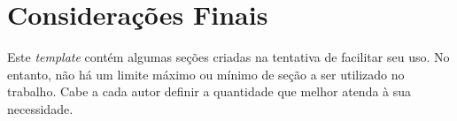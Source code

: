 \chapter{Considerações Finais}\label{sec:consideracoesfinais}

Este \textit{template} contém algumas seções criadas na tentativa de facilitar seu uso. No entanto, não há um limite máximo ou mínimo de seção a ser utilizado no trabalho. Cabe a cada autor definir a quantidade que melhor atenda à sua 
necessidade.  